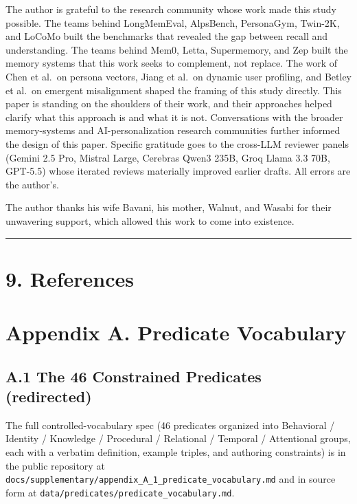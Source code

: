 The author is grateful to the research community whose work made this
study possible. The teams behind LongMemEval, AlpsBench, PersonaGym,
Twin-2K, and LoCoMo built the benchmarks that revealed the gap between
recall and understanding. The teams behind Mem0, Letta, Supermemory, and
Zep built the memory systems that this work seeks to complement, not
replace. The work of Chen et al.~on persona vectors, Jiang et al.~on
dynamic user profiling, and Betley et al.~on emergent misalignment
shaped the framing of this study directly. This paper is standing on the
shoulders of their work, and their approaches helped clarify what this
approach is and what it is not. Conversations with the broader
memory-systems and AI-personalization research communities further
informed the design of this paper. Specific gratitude goes to the
cross-LLM reviewer panels (Gemini 2.5 Pro, Mistral Large, Cerebras Qwen3
235B, Groq Llama 3.3 70B, GPT-5.5) whose iterated reviews materially
improved earlier drafts. All errors are the author's.

The author thanks his wife Bavani, his mother, Walnut, and Wasabi for
their unwavering support, which allowed this work to come into
existence.

\begin{center}\rule{0.5\linewidth}{0.5pt}\end{center}

\hypertarget{references}{%
\section{9. References}\label{references}}




\clearpage

\hypertarget{appendix-a.-predicate-vocabulary}{%
\section{Appendix A. Predicate
Vocabulary}\label{appendix-a.-predicate-vocabulary}}

\hypertarget{a.1-the-46-constrained-predicates-redirected}{%
\subsection{A.1 The 46 Constrained Predicates
(redirected)}\label{a.1-the-46-constrained-predicates-redirected}}

The full controlled-vocabulary spec (46 predicates organized into
Behavioral / Identity / Knowledge / Procedural / Relational / Temporal /
Attentional groups, each with a verbatim definition, example triples,
and authoring constraints) is in the public repository at
\texttt{docs/supplementary/appendix\_A\_1\_predicate\_vocabulary.md} and
in source form at \texttt{data/predicates/predicate\_vocabulary.md}.


